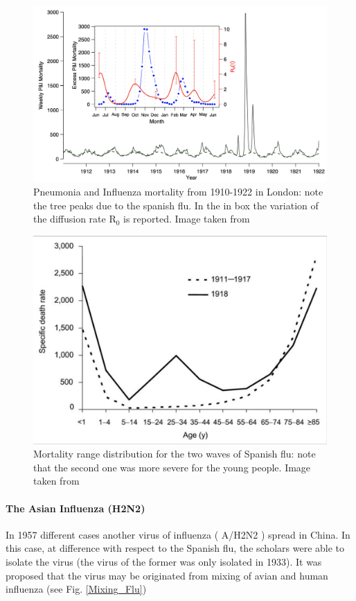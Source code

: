 \documentclass[
12pt, %
a4paper, %
oneside, %
headinclude,footinclude, %
BCOR5mm, %
]{scrartcl}
\begin{document}
\begin{figure}[h]
 \centering
 \includegraphics[width=1\linewidth]{Figures/SpanishFLU.png} 
 \caption{Pneumonia and Influenza mortality from 1910-1922 in London: note the tree peaks due to the spanish flu. In the in box the variation of the diffusion rate R$_{0}$ is reported. Image taken from \cite{he2011mechanistic} }
 \label{SpanishFLU}
\end{figure}

\begin{figure}[h]
 \centering
 \includegraphics[width=0.6\linewidth]{Figures/Mortality_spanish_flu.png} 
 \caption{Mortality range distribution for the two waves of Spanish flu: note that the second one was more severe for the young people. Image taken from \cite{taubenberger20061918}}
 \label{Mortality_spanish_flu}
\end{figure}

\clearpage

\paragraph{The Asian Influenza (H2N2)}

In 1957 different cases another virus of influenza ( A/H2N2 ) spread in China. In this case, at difference with respect to the Spanish flu, the scholars were able to isolate the virus (the virus of the former was only isolated in 1933). It was proposed that the virus may be originated from mixing of avian and human influenza (see Fig. \ref{Mixing_Flu})
\end{document}
